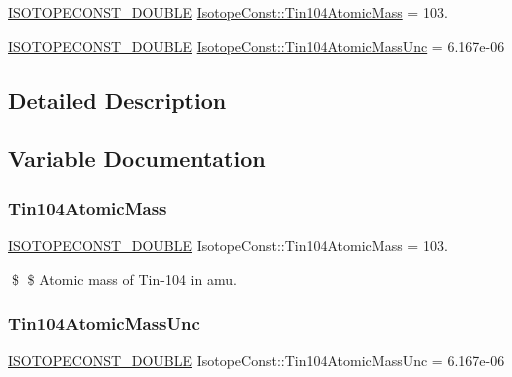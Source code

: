 \begin{DoxyCompactItemize}
\item 
\mbox{\hyperlink{group___isotope_const-_macros_ga8f45a7272ce02c0b4c65c44636ed719a}{I\+S\+O\+T\+O\+P\+E\+C\+O\+N\+S\+T\+\_\+\+D\+O\+U\+B\+LE}} \mbox{\hyperlink{group___isotope_const-_tin-_sn104_gad03b574e459a441dc8cf8fe2653acc82}{Isotope\+Const\+::\+Tin104\+Atomic\+Mass}} = 103.
\item 
\mbox{\hyperlink{group___isotope_const-_macros_ga8f45a7272ce02c0b4c65c44636ed719a}{I\+S\+O\+T\+O\+P\+E\+C\+O\+N\+S\+T\+\_\+\+D\+O\+U\+B\+LE}} \mbox{\hyperlink{group___isotope_const-_tin-_sn104_gabd4df7c276c23c6f45d0000147d78603}{Isotope\+Const\+::\+Tin104\+Atomic\+Mass\+Unc}} = 6.\+167e-\/06
\end{DoxyCompactItemize}


\subsection{Detailed Description}


\subsection{Variable Documentation}
\mbox{\label{group___isotope_const-_tin-_sn104_gad03b574e459a441dc8cf8fe2653acc82}} 
\subsubsection{\texorpdfstring{Tin104\+Atomic\+Mass}{Tin104AtomicMass}}
{\footnotesize\ttfamily \mbox{\hyperlink{group___isotope_const-_macros_ga8f45a7272ce02c0b4c65c44636ed719a}{I\+S\+O\+T\+O\+P\+E\+C\+O\+N\+S\+T\+\_\+\+D\+O\+U\+B\+LE}} Isotope\+Const\+::\+Tin104\+Atomic\+Mass = 103.}

\$ \$ Atomic mass of Tin-\/104 in amu. \mbox{\label{group___isotope_const-_tin-_sn104_gabd4df7c276c23c6f45d0000147d78603}} 
\subsubsection{\texorpdfstring{Tin104\+Atomic\+Mass\+Unc}{Tin104AtomicMassUnc}}
{\footnotesize\ttfamily \mbox{\hyperlink{group___isotope_const-_macros_ga8f45a7272ce02c0b4c65c44636ed719a}{I\+S\+O\+T\+O\+P\+E\+C\+O\+N\+S\+T\+\_\+\+D\+O\+U\+B\+LE}} Isotope\+Const\+::\+Tin104\+Atomic\+Mass\+Unc = 6.\+167e-\/06}

